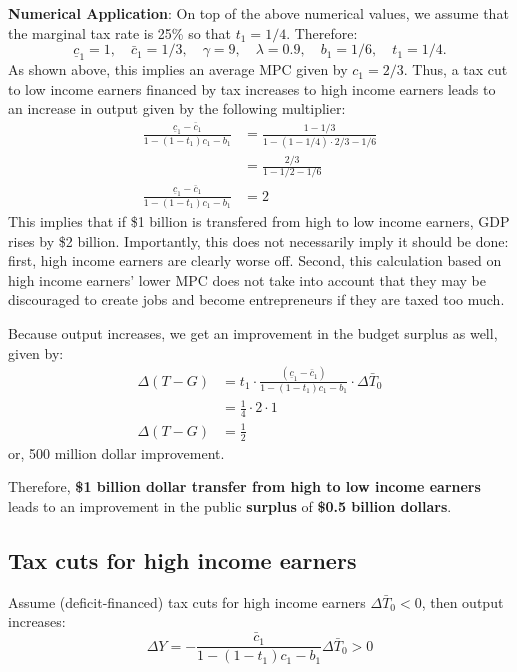 \documentclass[]{book}
\theoremstyle{definition}
\theoremstyle{definition}
\theoremstyle{definition}
\theoremstyle{remark}
\begin{document}
\textbf{Numerical Application}: On top of the above numerical values, we
assume that the marginal tax rate is 25\% so that \(t_1=1/4\).
Therefore:
\[\underline{c}_{1}=1, \quad \bar{c}_{1}=1/3,\quad \gamma=9, \quad\lambda=0.9,\quad b_1=1/6, \quad t_1=1/4.\]
As shown above, this implies an average MPC given by \(c_1=2/3.\) Thus,
a tax cut to low income earners financed by tax increases to high income
earners leads to an increase in output given by the following
multiplier: \[
\begin{aligned}
\frac{\underline{c}_{1}-\bar{c}_{1}}{1-(1-t_1)c_{1}-b_{1}} &= \frac{1-1/3}{1-(1-1/4) \cdot 2/3-1/6}\\
&= \frac{2/3}{1-1/2-1/6}\\
\frac{\underline{c}_{1}-\bar{c}_{1}}{1-(1-t_1)c_{1}-b_{1}} &=2
\end{aligned}
\] This implies that if \$1 billion is transfered from high to low
income earners, GDP rises by \$2 billion. Importantly, this does not
necessarily imply it should be done: first, high income earners are
clearly worse off. Second, this calculation based on high income
earners' lower MPC does not take into account that they may be
discouraged to create jobs and become entrepreneurs if they are taxed
too much.

Because output increases, we get an improvement in the budget surplus as
well, given by: \[
\begin{aligned}
\Delta\left(T-G\right)&=t_1 \cdot \frac{\left(\underline{c}_{1}-\bar{c}_{1}\right)}{1-\left(1-t_{1}\right)c_{1}-b_{1}} \cdot \Delta\bar{T}_{0}\\
&=\frac{1}{4} \cdot 2 \cdot 1\\
\Delta\left(T-G\right)&=\frac{1}{2}
\end{aligned}
\] or, 500 million dollar improvement.

Therefore, \textbf{\$1 billion dollar transfer from high to low income
earners} leads to an improvement in the public \textbf{surplus} of
\textbf{\$0.5 billion dollars}.

\subsection{Tax cuts for high income
earners}\label{tax-cuts-for-high-income-earners}

Assume (deficit-financed) tax cuts for high income earners
\(\Delta\bar{T}_{0}<0\), then output increases:
\[\Delta Y=-\frac{\bar{c}_{1}}{1-\left(1-t_{1}\right)c_{1}-b_{1}}\Delta\bar{T}_{0}>0\]
\end{document}
